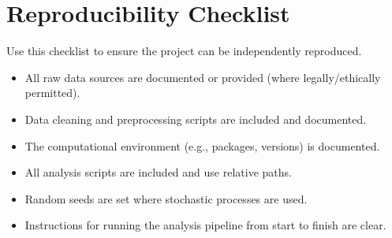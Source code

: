 \documentclass[
]{report}
\author{}
\date{}
\providecommand{\tightlist}{%
  \setlength{\itemsep}{0pt}\setlength{\parskip}{0pt}}
\renewcommand*\contentsname{Table of contents}
\newcommand\contentsname{Table of contents}
\begin{document}
\renewcommand*\contentsname{Table of contents}
{
\hypersetup{linkcolor=}
\setcounter{tocdepth}{2}
\tableofcontents
}

\chapter{Reproducibility Checklist}\label{reproducibility-checklist}

Use this checklist to ensure the project can be independently
reproduced.

\begin{itemize}
\tightlist
\item[$\square$]
  All raw data sources are documented or provided (where
  legally/ethically permitted).
\item[$\square$]
  Data cleaning and preprocessing scripts are included and documented.
\item[$\square$]
  The computational environment (e.g., packages, versions) is
  documented.
\item[$\square$]
  All analysis scripts are included and use relative paths.
\item[$\square$]
  Random seeds are set where stochastic processes are used.
\item[$\square$]
  Instructions for running the analysis pipeline from start to finish
  are clear.
\end{itemize}
\end{document}

